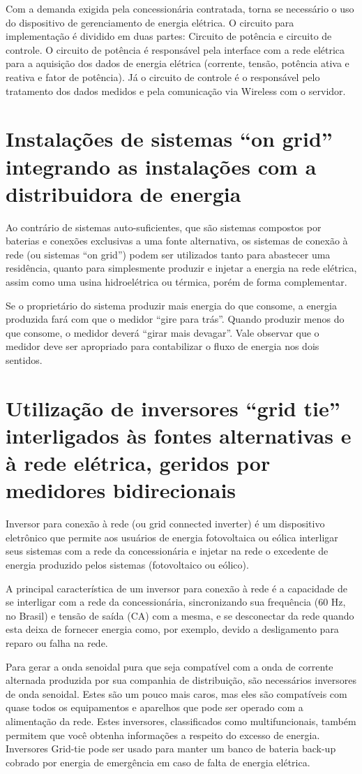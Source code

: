 Com a demanda exigida pela concessionária contratada, torna se necessário o uso do dispositivo de gerenciamento de energia elétrica.
O circuito para implementação é dividido em duas partes: Circuito de potência e circuito de controle.
O circuito de potência é responsável pela interface com a rede elétrica para a aquisição dos dados de energia elétrica (corrente, tensão, potência ativa e reativa e fator de potência). Já o circuito de controle é o responsável pelo tratamento dos dados medidos e pela comunicação via Wireless com o servidor.

\section{Instalações de sistemas “on grid” integrando as instalações com a distribuidora de energia}
Ao contrário de sistemas auto-suficientes, que são sistemas compostos por baterias e conexões exclusivas a uma fonte alternativa, os sistemas de conexão à rede (ou sistemas “on grid”) podem ser utilizados tanto para abastecer uma residência, quanto para simplesmente produzir e injetar a energia na rede elétrica, assim como uma usina hidroelétrica ou térmica, porém de forma complementar.

Se o proprietário do sistema produzir mais energia do que consome, a energia produzida fará com que o medidor “gire para trás”. Quando produzir menos do que consome, o medidor deverá “girar mais devagar”. Vale observar que o medidor deve ser apropriado para contabilizar o fluxo de energia nos dois sentidos.

\section{Utilização de inversores “grid tie” interligados às fontes alternativas e à rede elétrica, geridos por medidores bidirecionais}
Inversor para conexão à rede (ou grid connected inverter) é um dispositivo eletrônico que permite aos usuários de energia fotovoltaica ou eólica interligar seus sistemas com a rede da concessionária e injetar na rede o excedente de energia produzido pelos sistemas (fotovoltaico ou eólico). 

A principal característica de um inversor para conexão à rede é a capacidade de se interligar com a rede da concessionária, sincronizando sua frequência (60 Hz, no Brasil) e tensão de saída (CA) com a mesma, e se desconectar da rede quando esta deixa de fornecer energia como, por exemplo, devido a desligamento para reparo ou falha na rede. 

Para gerar a onda senoidal pura que seja compatível com a onda de corrente alternada produzida por sua companhia de distribuição, são necessários inversores de onda senoidal. Estes são um pouco mais caros, mas eles são compatíveis com quase todos os equipamentos e aparelhos que pode ser operado com a alimentação da rede. Estes inversores, classificados como multifuncionais, também permitem que você obtenha informações a respeito do excesso de energia. Inversores Grid-tie pode ser usado para manter um banco de bateria back-up cobrado por energia de emergência em caso de falta de energia elétrica.
